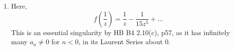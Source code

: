 \begin{enumerate}[label=(\alph*)]
\begin{enumerate}[label=(\roman*)]
\begin{align*}
             &= \left( z + \frac{z^3}{3!} + \frac{z^5}{5!} + \ldots \right) - \frac{1}{3!}\left( z^3 + \frac{z^5}{3!} + \ldots \right) + \frac{1}{5!}\left( z^5 + \ldots \right) \\
             &= z + \left( \frac{1}{3!} - \frac{1}{3!} \right)z^3 + \left( \frac{1}{5!} - \frac{1}{12} + \frac{1}{5!} \right)z^5 + \ldots \\
             &= z - \frac{z^5}{15} + \ldots \quad \text{for } z \in \C, \text{ as required}.
        \end{align*}
        \vvs \\
        \item 
        Here,
        \[ f\left(\frac{1}{z}\right) = \frac{1}{z} - \frac{1}{15z^5} + \ldots \]
        This is an essential singularity by HB B4 2.10(c), p57, as it has infinitely many $ a_n  \neq 0 $ for $n<0$, in its Laurent Series about 0.



\end{enumerate}
\end{enumerate}
